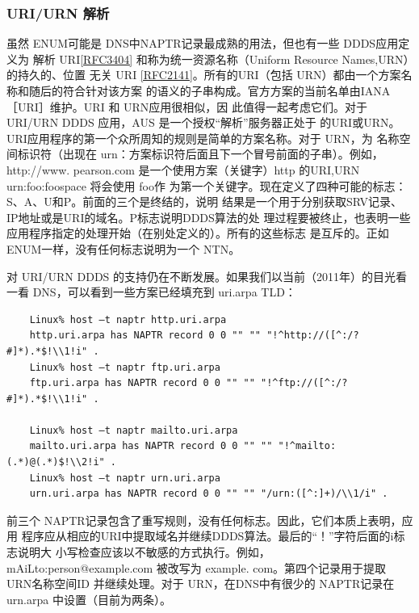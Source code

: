 \subsubsection{ URI/URN 解析}

虽然 ENUM可能是 DNS中NAPTR记录最成熟的用法，但也有一些 DDDS应用定义为
解析 URI\href{https://www.rfc-editor.org/rfc/rfc3404}{[RFC3404]}
和称为统一资源名称（Uniform Resource Names,URN）的持久的、位置
无关 URI
\href{https://www.rfc-editor.org/rfc/rfc2141}{[RFC2141]}。所有的URI（包括
URN）都由一个方案名称和随后的符合针对该方案
的语义的子串构成。官方方案的当前名单由IANA［URI］维护。URI 和 URN应用很相似，因
此值得一起考虑它们。对于 URI/URN DDDS 应用，AUS 是一个授权“解析”服务器正处于
的URI或URN。URI应用程序的第一个众所周知的规则是简单的方案名称。对于 URN，为
名称空间标识符（出现在 urn：方案标识符后面且下一个冒号前面的子串）。例如，http://www.
pearson.com 是一个使用方案（关键字）http 的URI,URN urn:foo:foospace 将会使用 foo作
为第一个关键字。现在定义了四种可能的标志：S、A、U和P。前面的三个是终结的，说明
结果是一个用于分别获取SRV记录、IP地址或是URI的域名。P标志说明DDDS算法的处
理过程要被终止，也表明一些应用程序指定的处理开始（在别处定义的）。所有的这些标志
是互斥的。正如 ENUM一样，没有任何标志说明为一个 NTN。

对 URI/URN DDDS 的支持仍在不断发展。如果我们以当前（2011年）的目光看一看
DNS，可以看到一些方案已经填充到 uri.arpa TLD：

\begin{verbatim}
    Linux% host –t naptr http.uri.arpa
    http.uri.arpa has NAPTR record 0 0 "" "" "!^http://([^:/?#]*).*$!\\1!i" .
    Linux% host –t naptr ftp.uri.arpa
    ftp.uri.arpa has NAPTR record 0 0 "" "" "!^ftp://([^:/?#]*).*$!\\1!i" .

    Linux% host –t naptr mailto.uri.arpa
    mailto.uri.arpa has NAPTR record 0 0 "" "" "!^mailto:(.*)@(.*)$!\\2!i" .
    Linux% host –t naptr urn.uri.arpa
    urn.uri.arpa has NAPTR record 0 0 "" "" "/urn:([^:]+)/\\1/i" .
\end{verbatim}

前三个 NAPTR记录包含了重写规则，没有任何标志。因此，它们本质上表明，应用
程序应从相应的URI中提取域名并继续DDDS算法。最后的“！”字符后面的i标志说明大
小写检查应该以不敏感的方式执行。例如，mAiLto:person@example.com 被改写为 example.
com。第四个记录用于提取 URN名称空间ID 并继续处理。对于 URN，在DNS中有很少的
NAPTR记录在 urn.arpa 中设置（目前为两条）。

